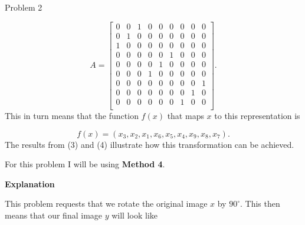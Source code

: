 \begin{problem}{Problem 2}
\begin{Highlight}
        \begin{equation}
            A =
            \begin{bmatrix}
                0 & 0 & 1 & 0 & 0 & 0 & 0 & 0 & 0 \\
                0 & 1 & 0 & 0 & 0 & 0 & 0 & 0 & 0 \\
                1 & 0 & 0 & 0 & 0 & 0 & 0 & 0 & 0 \\
                0 & 0 & 0 & 0 & 0 & 1 & 0 & 0 & 0 \\
                0 & 0 & 0 & 0 & 1 & 0 & 0 & 0 & 0 \\
                0 & 0 & 0 & 1 & 0 & 0 & 0 & 0 & 0 \\
                0 & 0 & 0 & 0 & 0 & 0 & 0 & 0 & 1 \\
                0 & 0 & 0 & 0 & 0 & 0 & 0 & 1 & 0 \\
                0 & 0 & 0 & 0 & 0 & 0 & 1 & 0 & 0 \\
            \end{bmatrix}.
        \end{equation}
        This in turn means that the function $f(x)$ that maps $x$ to this representation is 

        \begin{equation}
            f(x) = (x_{3},x_{2},x_{1},x_{6},x_{5},x_{4},x_{9},x_{8},x_{7}).
        \end{equation}
        The results from (3) and (4) illustrate how this transformation can be achieved.
    \end{Highlight}

    \begin{Highlight}
        For this problem I will be using \textbf{Method 4}. \vspace*{1em}

        \noindent \textbf{Explanation} \vspace*{1em}

        This problem requests that we rotate the original image $x$ by $90^{\circ}$. This then means that our final image $y$ will look like


\end{Highlight}
\end{problem}
